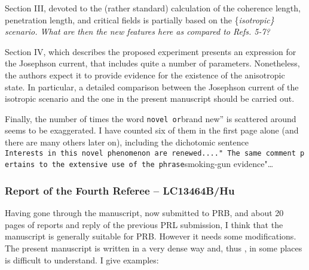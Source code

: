 \documentclass[11pt]{article}
\begin{document}
Section III, devoted to the (rather standard) calculation of the
coherence length, penetration length, and critical fields is partially
based on the \{\em isotropic\} scenario. What are then the new features
here as compared to Refs. 5-7?

Section IV, which describes the proposed experiment presents an
expression for the Josephson current, that includes quite a number of
parameters. Nonetheless, the authors expect it to provide evidence for
the existence of the anisotropic state. In particular, a detailed
comparison between the Josephson current of the isotropic scenario and
the one in the present manuscript should be carried out.

Finally, the number of times the word
\texttt{novel\textquotesingle{}\ or}brand new'' is scattered around
seems to be exaggerated. I have counted six of them in the first page
alone (and there are many others later on), including the dichotomic
sentence
\texttt{Interests\ in\ this\ novel\ phenomenon\ are\ renewed...."\ The\ same\ comment\ pertains\ to\ the\ extensive\ use\ of\ the\ phrase}smoking-gun
evidence"\ldots{}

\hypertarget{report-of-the-fourth-referee-lc13464bhu}{%
\subsubsection{Report of the Fourth Referee --
LC13464B/Hu}\label{report-of-the-fourth-referee-lc13464bhu}}

Having gone through the manuscript, now submitted to PRB, and about 20
pages of reports and reply of the previous PRL submission, I think that
the manuscript is generally suitable for PRB. However it needs some
modifications. The present manuscript is written in a very dense way
and, thus , in some places is difficult to understand. I give examples:
\end{document}
